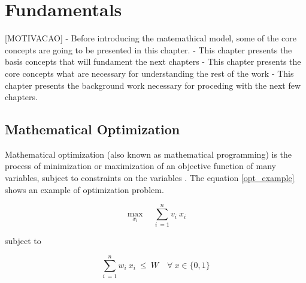 \chapter{Fundamentals}
[MOTIVACAO] 
- Before introducing the matemathical model, some of the core concepts are going to be presented in this chapter. 
- This chapter presents the basis concepts that will fundament the next chapters
- This chapter presents the core concepts what are necessary for understanding the rest of the work
- This chapter presents the background work necessary for proceding with the next few chapters. 


\iffalse

\section{Mathematical Optimization}




Mathematical optimization (also known as mathematical programming) is the process of minimization or maximization of an objective function of many variables, subject to constraints on the variables \cite{ampl}. The equation \eqref{opt_example} shows an example of optimization problem.

\begin{equation} \label{opt_example}
    \max_{x_i} \quad \sum_{i\ = 1}^{n} v_i\ x_i
\end{equation}

subject to 

\begin{equation}
    \sum_{i\ = 1}^{n} w_i\ x_i \ \leq \ W \quad \forall \ x \in \{0,1\}
\end{equation}


